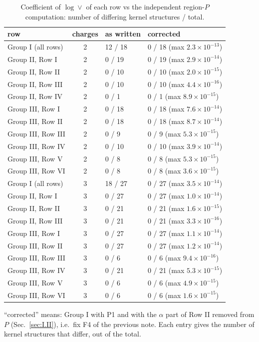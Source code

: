 \documentclass[10pt]{article}
\numberwithin{equation}{section}
\begin{document}
\begin{table}[H]
\centering\small
\begin{tabular}{@{}l c l l@{}}
row & charges & as written & corrected \\ \hline
Group I (all rows) & 2 & 12 / 18 & 0 / 18 (max $2.3\times10^{-13}$)\\
Group II, Row I & 2 & 0 / 19 & 0 / 19 (max $2.9\times10^{-14}$)\\
Group II, Row II & 2 & 0 / 10 & 0 / 10 (max $2.0\times10^{-15}$)\\
Group II, Row III & 2 & 0 / 10 & 0 / 10 (max $4.4\times10^{-16}$)\\
Group II, Row IV & 2 & 0 / 1 & 0 / 1 (max $8.9\times10^{-15}$)\\
Group III, Row I & 2 & 0 / 18 & 0 / 18 (max $7.6\times10^{-14}$)\\
Group III, Row II & 2 & 0 / 18 & 0 / 18 (max $8.7\times10^{-14}$)\\
Group III, Row III & 2 & 0 / 9 & 0 / 9 (max $5.3\times10^{-15}$)\\
Group III, Row IV & 2 & 0 / 10 & 0 / 10 (max $3.9\times10^{-14}$)\\
Group III, Row V & 2 & 0 / 8 & 0 / 8 (max $5.3\times10^{-15}$)\\
Group III, Row VI & 2 & 0 / 8 & 0 / 8 (max $3.6\times10^{-15}$)\\
Group I (all rows) & 3 & 18 / 27 & 0 / 27 (max $3.5\times10^{-14}$)\\
Group II, Row I & 3 & 0 / 27 & 0 / 27 (max $1.0\times10^{-14}$)\\
Group II, Row II & 3 & 0 / 21 & 0 / 21 (max $1.6\times10^{-15}$)\\
Group II, Row III & 3 & 0 / 21 & 0 / 21 (max $3.3\times10^{-16}$)\\
Group III, Row I & 3 & 0 / 27 & 0 / 27 (max $1.1\times10^{-14}$)\\
Group III, Row II & 3 & 0 / 27 & 0 / 27 (max $1.2\times10^{-14}$)\\
Group III, Row III & 3 & 0 / 6 & 0 / 6 (max $9.4\times10^{-16}$)\\
Group III, Row IV & 3 & 0 / 21 & 0 / 21 (max $5.3\times10^{-15}$)\\
Group III, Row V & 3 & 0 / 6 & 0 / 6 (max $4.9\times10^{-15}$)\\
Group III, Row VI & 3 & 0 / 6 & 0 / 6 (max $1.6\times10^{-15}$)\\
\end{tabular}
\caption{Coefficient of $\log\vee$ of each row vs the independent region-$P$ computation: number of differing kernel structures / total.}\label{tab:rowsP}
\end{table}
``corrected'' means: Group I with P1 and with the $\alpha$ part of Row II removed from $P$ (Sec.~\ref{sec:I.II}), i.e.\ fix F4 of the previous note. Each entry gives the number of kernel structures that differ, out of the total.
\end{document}
